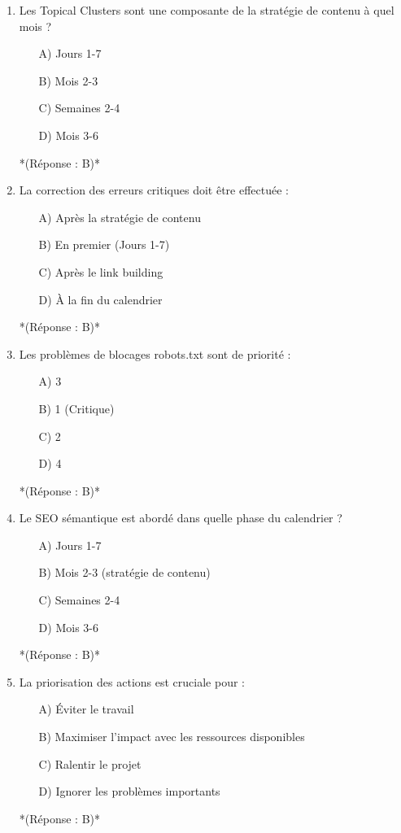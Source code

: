 \documentclass[12pt,a4paper,twoside]{report}
\begin{document}
\begin{enumerate}
    \item Les Topical Clusters sont une composante de la stratégie de contenu à quel mois ?
    \begin{itemize}
        \item[A)] Jours 1-7
        \item[B)] Mois 2-3
        \item[C)] Semaines 2-4
        \item[D)] Mois 3-6
    \end{itemize}
    *(Réponse : B)*

    \item La correction des erreurs critiques doit être effectuée :
    \begin{itemize}
        \item[A)] Après la stratégie de contenu
        \item[B)] En premier (Jours 1-7)
        \item[C)] Après le link building
        \item[D)] À la fin du calendrier
    \end{itemize}
    *(Réponse : B)*

    \item Les problèmes de blocages robots.txt sont de priorité :
    \begin{itemize}
        \item[A)] 3
        \item[B)] 1 (Critique)
        \item[C)] 2
        \item[D)] 4
    \end{itemize}
    *(Réponse : B)*

    \item Le SEO sémantique est abordé dans quelle phase du calendrier ?
    \begin{itemize}
        \item[A)] Jours 1-7
        \item[B)] Mois 2-3 (stratégie de contenu)
        \item[C)] Semaines 2-4
        \item[D)] Mois 3-6
    \end{itemize}
    *(Réponse : B)*

    \item La priorisation des actions est cruciale pour :
    \begin{itemize}
        \item[A)] Éviter le travail
        \item[B)] Maximiser l'impact avec les ressources disponibles
        \item[C)] Ralentir le projet
        \item[D)] Ignorer les problèmes importants
    \end{itemize}
    *(Réponse : B)*


\end{enumerate}
\end{document}
